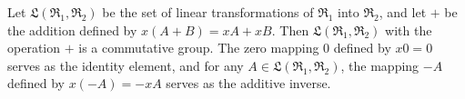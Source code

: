 Let $\mathfrak{L}(\mathfrak{R}_1, \mathfrak{R}_2)$ be the set of linear transformations of $\mathfrak{R}_1$ into $\mathfrak{R}_2$, and let $+$ be the addition defined by $x(A+B) = xA + xB$. Then $\mathfrak{L}(\mathfrak{R}_1, \mathfrak{R}_2)$ with the operation $+$ is a commutative group. The zero mapping $0$ defined by $x0 = 0$ serves as the identity element, and for any $A \in \mathfrak{L}(\mathfrak{R}_1, \mathfrak{R}_2)$, the mapping $-A$ defined by $x(-A) = -xA$ serves as the additive inverse.
